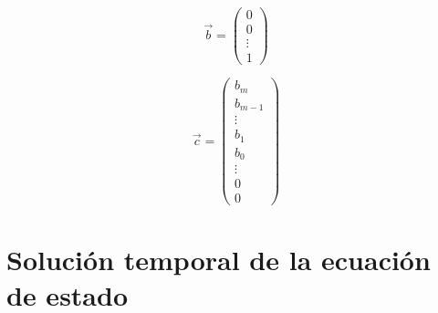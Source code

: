 \begin{equation}
\vec{b} =
\begin{pmatrix}
0 \\
0 \\
\vdots \\
1
\end{pmatrix}
\end{equation}

\begin{equation}
\vec{c} =
\begin{pmatrix}
b_m     \\
b_{m-1} \\
\vdots  \\
b_1     \\
b_0     \\
\vdots  \\
0       \\
0
\end{pmatrix}
\end{equation}

\section{Solución temporal de la ecuación de estado}

